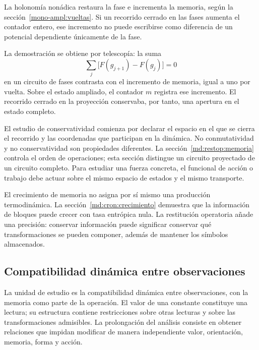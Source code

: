 La holonomía nonádica restaura la fase e incrementa la memoria, según
la sección~\ref{mono-ampl:vueltas}. Si un recorrido cerrado en las fases
aumenta el contador entero, ese incremento no puede escribirse como
diferencia de un potencial dependiente únicamente de la fase.

La demostración se obtiene por telescopía: la suma
\begin{equation}
 \sum_j\bigl[F(g_{j+1})-F(g_j)\bigr]=0
 \label{md:restop:potencial-fase}
\end{equation}
en un circuito de fases contrasta con el incremento de memoria, igual
a uno por vuelta. Sobre el estado ampliado, el contador $m$ registra
ese incremento. El recorrido cerrado en la proyección conservaba,
por tanto, una apertura en el estado completo.

El estudio de conservatividad comienza por declarar el espacio en el
que se cierra el recorrido y las coordenadas que participan en la
dinámica. No conmutatividad y no conservatividad son propiedades
diferentes. La sección~\ref{md:restop:memoria} controla el orden de
operaciones; esta sección distingue un circuito proyectado de un circuito
completo. Para estudiar una fuerza concreta, el funcional de acción o
trabajo debe actuar sobre el mismo espacio de estados y el mismo transporte.

El crecimiento de memoria no asigna por sí mismo una producción
termodinámica. La sección~\ref{md:cron:crecimiento} demuestra que la
información de bloques puede crecer con tasa entrópica nula.
La restitución operatoria añade una precisión: conservar información
puede significar conservar qué transformaciones se pueden componer,
además de mantener los símbolos almacenados.

\subsection{Compatibilidad dinámica entre observaciones}
\label{md:restop:sintesis}

La unidad de estudio es la compatibilidad dinámica entre observaciones,
con la memoria como parte de la operación. El valor de una constante
constituye una lectura; su estructura contiene restricciones sobre otras
lecturas y sobre las transformaciones admisibles. La prolongación del
análisis consiste en obtener relaciones que impidan modificar de manera
independiente valor, orientación, memoria, forma y acción.


